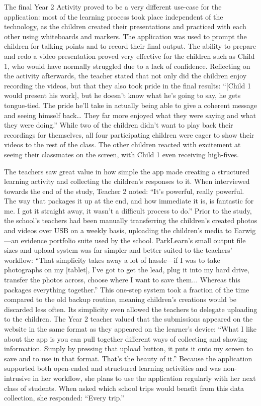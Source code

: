 The final Year 2 Activity proved to be a very different use-case for the application: most of the learning process took place independent of the technology, as the children created their presentations and practiced with each other using whiteboards and markers. The application was used to prompt the children for talking points and to record their final output. The ability to prepare and redo a video presentation proved very effective for the children such as Child 1, who would have normally struggled due to a lack of confidence. Reflecting on the activity afterwards, the teacher stated that not only did the children enjoy recording the videos, but that they also took pride in the final results: “[Child 1 would present his work], but he doesn’t know what he’s going to say, he gets tongue-tied. The pride he’ll take in actually being able to give a coherent message and seeing himself back… They far more enjoyed what they were saying and what they were doing.” While two of the children didn’t want to play back their recordings for themselves, all four participating children were eager to show their videos to the rest of the class. The other children reacted with excitement at seeing their classmates on the screen, with Child 1 even receiving high-fives. 

The teachers saw great value in how simple the app made creating a structured learning activity and collecting the children’s responses to it. When interviewed towards the end of the study, Teacher 2 noted: “It’s powerful, really powerful. The way that packages it up at the end, and how immediate it is, is fantastic for me. I got it straight away, it wasn’t a difficult process to do.” Prior to the study, the school’s teachers had been manually transferring the children’s created photos and videos over USB on a weekly basis, uploading the children’s media to Earwig—an evidence portfolio suite used by the school. ParkLearn’s small output file sizes and upload system was far simpler and better suited to the teachers’ workflow: “That simplicity takes away a lot of hassle—if I was to take photographs on my [tablet], I’ve got to get the lead, plug it into my hard drive, transfer the photos across, choose where I want to save them... Whereas this packages everything together.” This one-step system took a fraction of the time compared to the old backup routine, meaning children’s creations would be discarded less often. Its simplicity even allowed the teachers to delegate uploading to the children. The Year 2 teacher valued that the submissions appeared on the website in the same format as they appeared on the learner’s device: “What I like about the app is you can pull together different ways of collecting and showing information. Simply by pressing that upload button, it puts it onto my screen to save and to use in that format. That’s the beauty of it.” Because the application supported both open-ended and structured learning activities and was non-intrusive in her workflow, she plans to use the application regularly with her next class of students. When asked which school trips would benefit from this data collection, she responded: “Every trip.”

